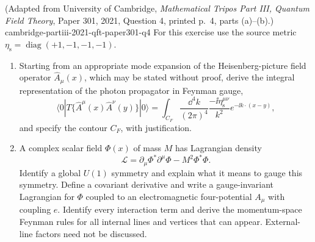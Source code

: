 \begin{enumerate}
  {(Adapted from University of Cambridge, \emph{Mathematical Tripos Part III,
  Quantum Field Theory}, Paper 301, 2021, Question 4, printed p.~4,
  parts (a)--(b).)}
  {cambridge-partiii-2021-qft-paper301-q4}
For this exercise use the source metric
\(\eta_{\mathrm s}=\operatorname{diag}(+1,-1,-1,-1)\).
\begin{enumerate}
\item
Starting from an appropriate mode expansion of the Heisenberg-picture field
operator \(\widehat A_\mu(x)\), which may be stated without proof, derive the
integral representation of the photon propagator in Feynman gauge,
\[
 \langle0|T\{\widehat A^\mu(x)\widehat A^\nu(y)\}|0\rangle
 =\int_{C_F}\frac{\dd^4k}{(2\pi)^4}
 \frac{-\ii\eta_{\mathrm s}^{\mu\nu}}{k^2}
 e^{-\ii k\cdot(x-y)},
\]
and specify the contour \(C_F\), with justification.
\item
A complex scalar field \(\Phi(x)\) of mass \(M\) has Lagrangian density
\[
 \mathcal L=\partial_\mu\Phi^*\partial^\mu\Phi-M^2\Phi^*\Phi.
\]
Identify a global \(U(1)\) symmetry and explain what it means to gauge this
symmetry.  Define a covariant derivative and write a gauge-invariant
Lagrangian for \(\Phi\) coupled to an electromagnetic four-potential
\(A_\mu\) with coupling \(e\).  Identify every interaction term and derive
the momentum-space Feynman rules for all internal lines and vertices that
can appear.  External-line factors need not be discussed.
\end{enumerate}


\end{enumerate}
